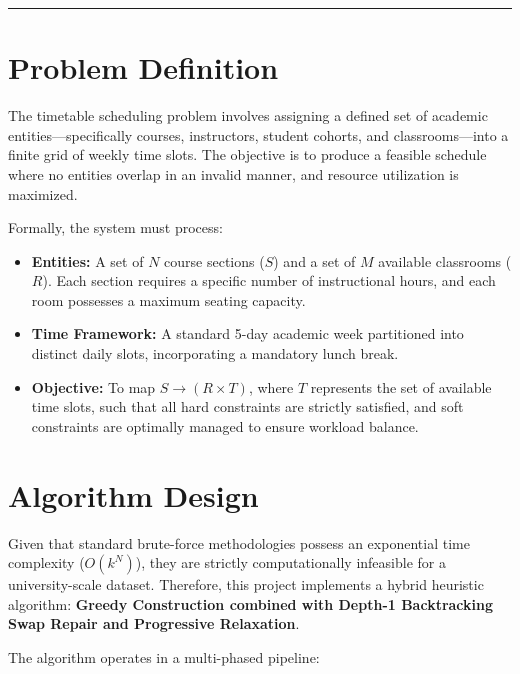 \documentclass[12pt, a4paper]{article}
\begin{document}
\vspace{0.5cm}
\hrule
\vspace{0.5cm}

\section{Problem Definition}

The timetable scheduling problem involves assigning a defined set of academic
entities---specifically courses, instructors, student cohorts, and classrooms---into a
finite grid of weekly time slots. The objective is to produce a feasible schedule where
no entities overlap in an invalid manner, and resource utilization is maximized.

Formally, the system must process:

\begin{itemize}[noitemsep, topsep=4pt]
    \item \textbf{Entities:} A set of $N$ course sections ($S$) and a set of $M$
          available classrooms ($R$). Each section requires a specific number of
          instructional hours, and each room possesses a maximum seating capacity.

    \item \textbf{Time Framework:} A standard 5-day academic week partitioned into
          distinct daily slots, incorporating a mandatory lunch break.

    \item \textbf{Objective:} To map $S \rightarrow (R \times T)$, where $T$ represents
          the set of available time slots, such that all hard constraints are strictly
          satisfied, and soft constraints are optimally managed to ensure workload
          balance.
\end{itemize}

\section{Algorithm Design}

Given that standard brute-force methodologies possess an exponential time complexity
($O(k^N)$), they are strictly computationally infeasible for a university-scale dataset.
Therefore, this project implements a hybrid heuristic algorithm: \textbf{Greedy
Construction combined with Depth-1 Backtracking Swap Repair and Progressive
Relaxation}.

The algorithm operates in a multi-phased pipeline:
\end{document}
